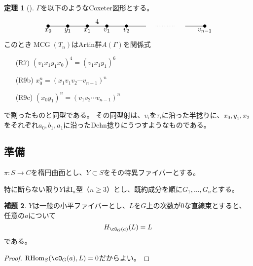 \documentclass[uplatex, a4paper, dvipdfmx]{jsarticle}
\theoremstyle{definition}
\newtheorem{theorem}{定理}[section]
\newtheorem{lemma}[theorem]{補題}
\DeclareMathOperator{\MCG}{\mathrm{MCG}}
\DeclareMathOperator{\RHom}{\mathrm{RHom}}
\begin{document}
\begin{theorem}[{\cite[Theorem 3.2]{MR1805936}}]
    $\Gamma$を以下のようなCoxeter図形とする。
    \begin{equation}\label{Coxeter_graph}
        \begin{tikzpicture}
            \foreach \u in {1, 2, 3, 4, 5, 9}
                {
                    \filldraw[black] (\u, 0) circle (2pt);
                    \draw[black] (\u, 0) circle (2pt);
                }
            \draw[thick] (1, 0)--(6, 0);
            \draw[dotted] (6.5, 0)--(7.5, 0);
            \draw[thick] (8, 0)--(9, 0);

            \draw(1, 0) node[below]{$x_0$};
            \draw(2, 0) node[below]{$y_1$};
            \draw(3, 0) node[below]{$x_1$};
            \draw(4, 0) node[below]{$v_1$};
            \draw(5, 0) node[below]{$v_2$};
            \draw(9, 0) node[below]{$v_{n-1}$};

            \draw(3.5, 0) node[above]{$4$};
        \end{tikzpicture}
    \end{equation}
    このとき$\MCG(T_n)$はArtin群$A(\Gamma)$を関係式
    \begin{enumerate}
        \item [(R7)] $(v_1x_1y_1x_0)^4 = (v_1x_1y_1)^6$
        \item [(R9b)] $x_0^n = (x_1 v_1v_2 \cdots v_{n-1})^n$
        \item [(R9c)] $(x_0y_1)^n = (v_1 v_2 \cdots v_{n-1})^n$
    \end{enumerate}
    で割ったものと同型である。
    その同型射は、$v_i$を$\tau_i$に沿った半捻りに、$x_0, y_1, x_2$をそれぞれ$a_0, b_1, a_1$に沿ったDehn捻りにうつすようなものである。
\end{theorem}
\subsection{準備}
$\pi \colon S \to C$を楕円曲面とし、$Y \subset S$をその特異ファイバーとする。

特に断らない限り$Y$は$\textrm{I}_n$型（$n \geq 3$）とし、既約成分を順に$G_1, \dots, G_n$とする。
\begin{lemma}
    $Y$は一般の小平ファイバーとし、$L$を$G$上の次数が$0$な直線束とすると、任意の$a$について
    \begin{equation}
        H_{\cO_G(a)}(L) = L
    \end{equation}
    である。
\end{lemma}
\begin{proof}
    $\RHom_S(\cO_G(a), L) = 0$だからよい。
\end{proof}
\end{document}
